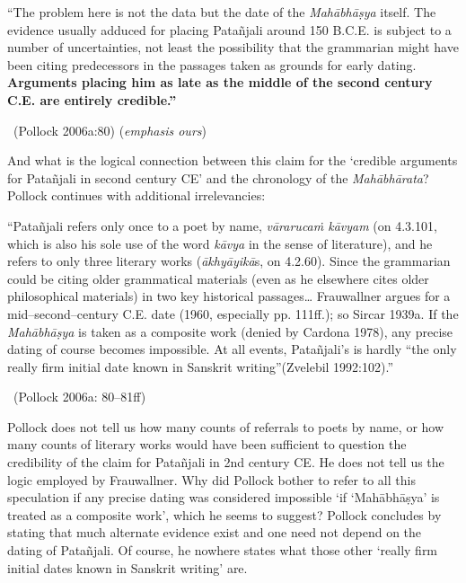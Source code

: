 \begin{myquote}
“The problem here is not the data but the date of the \textit{Mahābhāṣya} itself. The evidence usually adduced for placing Patañjali around 150 B.C.E. is subject to a number of uncertainties, not least the possibility that the grammarian might have been citing predecessors in the passages taken as grounds for early dating. \textbf{Arguments placing him as late as the middle of the second century C.E. are entirely credible.”} 

~\hfill (Pollock 2006a:80) (\textit{emphasis ours})
\end{myquote}

And what is the logical connection between this claim for the ‘credible arguments for Patañjali in second century CE’ and the chronology of the \textit{Mahābhārata}? Pollock continues with additional irrelevancies:

\begin{myquote}
“Patañjali refers only once to a poet by name, \textit{vārarucaṁ kāvyam} (on 4.3.101, which is also his sole use of the word \textit{kāvya} in the sense of literature), and he refers to only three literary works (\textit{ākhyāyikā}s, on 4.2.60). Since the grammarian could be citing older grammatical materials (even as he elsewhere cites older philosophical materials) in two key historical passages… Frauwallner argues for a mid–second–century C.E. date (1960, especially pp. 111ff.); so Sircar 1939a. If the \textit{Mahābhāṣya} is taken as a composite work (denied by Cardona 1978), any precise dating of course becomes impossible. At all events, Patañjali’s is hardly “the only really ﬁrm initial date known in Sanskrit writing”(Zvelebil 1992:102).” 

~\hfill (Pollock 2006a: 80–81ff)
\end{myquote}

Pollock does not tell us how many counts of referrals to poets by name, or how many counts of literary works would have been sufficient to question the credibility of the claim for Patañjali in 2nd century CE. He does not tell us the logic employed by Frauwallner. Why did Pollock bother to refer to all this speculation if any precise dating was considered impossible ‘if ‘Mahābhāṣya’ is treated as a composite work’, which he seems to suggest? Pollock concludes by stating that much alternate evidence exist and one need not depend on the dating of Patañjali. Of course, he nowhere states what those other ‘really firm initial dates known in Sanskrit writing’ are.


